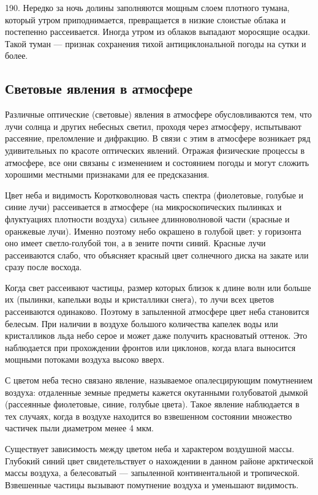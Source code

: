 190. Нередко за ночь долины заполняются мощным слоем плотного тумана, который утром приподнимается, превращается в низкие слоистые облака и постепенно рассеивается. Иногда утром из облаков выпадают моросящие осадки. Такой туман — признак сохранения тихой антициклональной погоды на сутки и более.

\subsection{Световые явления в атмосфере}

Различные оптические (световые) явления в атмосфере обусловливаются тем, что лучи солнца и других небесных светил, проходя через атмосферу, испытывают рассеяние, преломление и дифракцию. В связи с этим в атмосфере возникает ряд удивительных по красоте оптических явлений. Отражая физические процессы в атмосфере, все они связаны с изменением и состоянием погоды и могут сложить хорошими местными признаками для ее предсказания.

Цвет неба и видимость
Коротковолновая часть спектра (фиолетовые, голубые и синие лучи) рассеивается в атмосфере (на микроскопических пылинках и флуктуациях плотности воздуха) сильнее длинноволновой части (красные и оранжевые лучи). Именно поэтому небо окрашено в голубой цвет: у горизонта оно имеет светло-голубой тон, а в зените почти синий. Красные лучи рассеиваются слабо, что объясняет красный цвет солнечного диска на закате или сразу после восхода.

Когда свет рассеивают частицы, размер которых близок к длине волн или больше их (пылинки, капельки воды и кристаллики снега), то лучи всех цветов рассеиваются одинаково. Поэтому в запыленной атмосфере цвет неба становится белесым. При наличии в воздухе большого количества капелек воды или кристалликов льда небо серое и может даже получить красноватый оттенок. Это наблюдается при прохождении фронтов или циклонов, когда влага выносится мощными потоками воздуха высоко вверх.

С цветом неба тесно связано явление, называемое опалесцирующим помутнением воздуха: отдаленные земные предметы кажется окутанными голубоватой дымкой (рассеянные фиолетовые, синие, голубые цвета). Такое явление наблюдается в тех случаях, когда в воздухе находится во взвешенном состоянии множество частичек пыли диаметром менее 4 мкм.

Существует зависимость между цветом неба и характером воздушной массы. Глубокий синий цвет свидетельствует о нахождении в данном районе арктической массы воздуха, а белесоватый — запыленной континентальной и тропической. Взвешенные частицы вызывают помутнение воздуха и уменьшают видимость.

